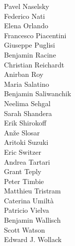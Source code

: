 \documentclass[PICOReport.tex]{subfiles}
\begin{document}
{\begin{multicols}{4}
Pavel Naselsky                  \\
Federico Nati                   \\
Elena Orlando                   \\
Francesco Piacentini            \\
Giuseppe Puglisi                \\
Benjamin Racine                 \\
Christian Reichardt             \\
Anirban Roy                     \\
Maria Salatino                  \\
Benjamin Saliwanchik            \\
Neelima Sehgal                  \\
Sarah Shandera                  \\
Erik Shirokoff                  \\
An\v{z}e Slosar                 \\
Aritoki Suzuki                  \\
Eric Switzer                    \\
Andrea Tartari                  \\
Grant Teply                     \\
Peter Timbie                    \\
Matthieu Tristram               \\
Caterina Umilt\`{a}             \\
Patricio Vielva                 \\
Benjamin Wallisch               \\
Scott Watson                    \\
Edward J. Wollack               
\end{multicols}

}
\end{document}

